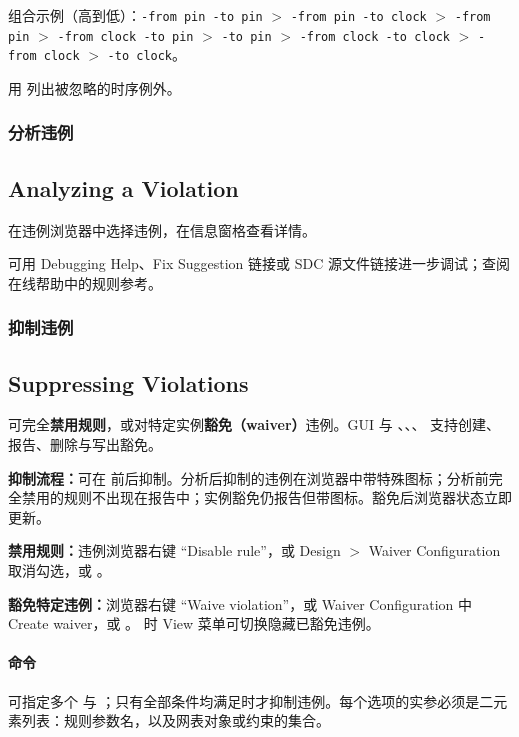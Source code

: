组合示例（高到低）：\texttt{-from pin -to pin} $>$ \texttt{-from pin -to clock} $>$ \texttt{-from pin} $>$ \texttt{-from clock -to pin} $>$ \texttt{-to pin} $>$ \texttt{-from clock -to clock} $>$ \texttt{-from clock} $>$ \texttt{-to clock}。

用  列出被忽略的时序例外。

\subsubsection{分析违例}
\subsection*{Analyzing a Violation}

在违例浏览器中选择违例，在信息窗格查看详情。

可用 Debugging Help、Fix Suggestion 链接或 SDC 源文件链接进一步调试；查阅在线帮助中的规则参考。

\subsubsection{抑制违例}
\subsection*{Suppressing Violations}

可完全\textbf{禁用规则}，或对特定实例\textbf{豁免（waiver）}违例。GUI 与 、、、 支持创建、报告、删除与写出豁免。


\textbf{抑制流程：}可在  前后抑制。分析后抑制的违例在浏览器中带特殊图标；分析前完全禁用的规则不出现在报告中；实例豁免仍报告但带图标。豁免后浏览器状态立即更新。

\textbf{禁用规则：}违例浏览器右键 “Disable rule”，或 Design $>$ Waiver Configuration 取消勾选，或 。

\textbf{豁免特定违例：}浏览器右键 “Waive violation”，或 Waiver Configuration 中 Create waiver，或 。 时 View 菜单可切换隐藏已豁免违例。

\paragraph{ 命令} 可指定多个  与 ；只有全部条件均满足时才抑制违例。每个选项的实参必须是二元素列表：规则参数名，以及网表对象或约束的集合。

